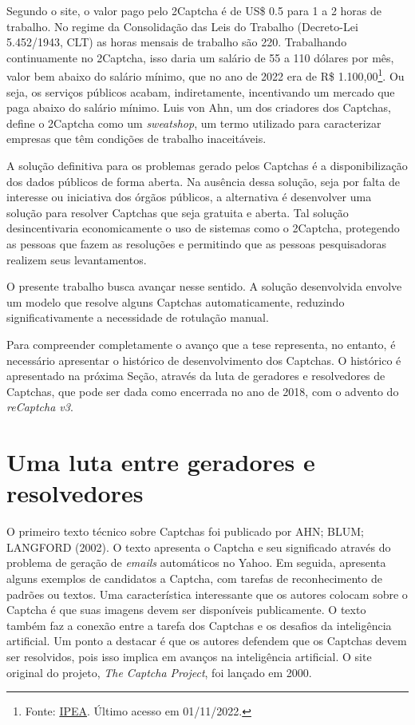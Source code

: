 \documentclass[12pt,twoside,brazilian]{book}
\begin{document}
Segundo o site, o valor pago pelo 2Captcha é de US\$ 0.5 para 1 a 2
horas de trabalho. No regime da Consolidação das Leis do Trabalho
(Decreto-Lei 5.452/1943, CLT) as horas mensais de trabalho são 220.
Trabalhando continuamente no 2Captcha, isso daria um salário de 55 a 110
dólares por mês, valor bem abaixo do salário mínimo, que no ano de 2022
era de R\$ 1.100,00\footnote{Fonte:
  \href{http://www.ipeadata.gov.br/exibeserie.aspx?stub=1\&serid1739471028=1739471028}{IPEA}.
  Último acesso em 01/11/2022.}. Ou seja, os serviços públicos acabam,
indiretamente, incentivando um mercado que paga abaixo do salário
mínimo. Luis von Ahn, um dos criadores dos Captchas, define o 2Captcha
como um \emph{sweatshop}, um termo utilizado para caracterizar empresas
que têm condições de trabalho inaceitáveis.

A solução definitiva para os problemas gerado pelos Captchas é a
disponibilização dos dados públicos de forma aberta. Na ausência dessa
solução, seja por falta de interesse ou iniciativa dos órgãos públicos,
a alternativa é desenvolver uma solução para resolver Captchas que seja
gratuita e aberta. Tal solução desincentivaria economicamente o uso de
sistemas como o 2Captcha, protegendo as pessoas que fazem as resoluções
e permitindo que as pessoas pesquisadoras realizem seus levantamentos.

O presente trabalho busca avançar nesse sentido. A solução desenvolvida
envolve um modelo que resolve alguns Captchas automaticamente, reduzindo
significativamente a necessidade de rotulação manual.

Para compreender completamente o avanço que a tese representa, no
entanto, é necessário apresentar o histórico de desenvolvimento dos
Captchas. O histórico é apresentado na próxima Seção, através da luta de
geradores e resolvedores de Captchas, que pode ser dada como encerrada
no ano de 2018, com o advento do \emph{reCaptcha v3}.

\hypertarget{sec-historia}{%
\section{Uma luta entre geradores e resolvedores}\label{sec-historia}}

O primeiro texto técnico sobre Captchas foi publicado por AHN; BLUM;
LANGFORD (2002). O texto apresenta o Captcha e seu significado através
do problema de geração de \emph{emails} automáticos no Yahoo. Em
seguida, apresenta alguns exemplos de candidatos a Captcha, com tarefas
de reconhecimento de padrões ou textos. Uma característica interessante
que os autores colocam sobre o Captcha é que suas imagens devem ser
disponíveis publicamente. O texto também faz a conexão entre a tarefa
dos Captchas e os desafios da inteligência artificial. Um ponto a
destacar é que os autores defendem que os Captchas devem ser resolvidos,
pois isso implica em avanços na inteligência artificial. O site original
do projeto, \emph{The Captcha Project}, foi lançado em 2000.
\end{document}
